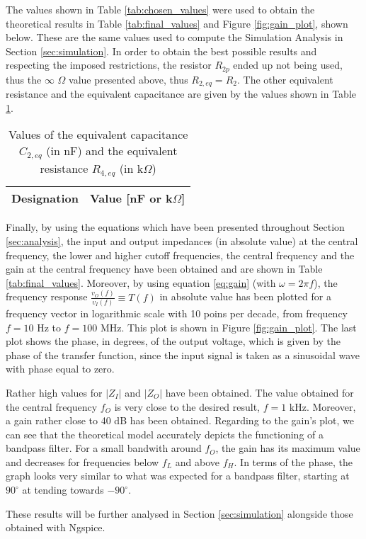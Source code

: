 The values shown in Table \ref{tab:chosen_values} were used to obtain the theoretical results in Table \ref{tab:final_values} and Figure \ref{fig:gain_plot}, shown below. These are the same values used to compute the Simulation Analysis in Section \ref{sec:simulation}. In order to obtain the best possible results and respecting the imposed restrictions, the resistor $R_{2p}$ ended up not being used, thus the $\infty$ $\Omega$ value presented above, thus $R_{2,eq}=R_2$. The other equivalent resistance and the equivalent capacitance are given by the values shown in Table \ref{tab:chosen_equiv_values}.

\begin{table}[H]
  \centering
  \begin{tabular}{|c|c|}
    \hline    
    {\bf Designation} & {\bf Value [nF or k$\Omega$]} \\ \hline
    
  \end{tabular}
  \caption{Values of the equivalent capacitance $C_{2,eq}$ (in nF) and the equivalent resistance $R_{4,eq}$ (in k$\Omega$)}
  \label{tab:chosen_equiv_values}
\end{table}

Finally, by using the equations which have been presented throughout Section \ref{sec:analysis}, the input and output impedances (in absolute value) at the central frequency, the lower and higher cutoff frequencies, the central frequency and the gain at the central frequency have been obtained and are shown in Table \ref{tab:final_values}. Moreover, by using equation \ref{eq:gain} (with $\omega=2\pi f$), the frequency response $\frac{v_O(f)}{v_I(f)}\equiv T(f)$ in absolute value has been plotted for a frequency vector in logarithmic scale with 10 poins per decade, from frequency $f=10$ Hz to $f=100$ MHz. This plot is shown in Figure \ref{fig:gain_plot}. The last plot shows the phase, in degrees, of the output voltage, which is given by the phase of the transfer function, since the input signal is taken as a sinusoidal wave with phase equal to zero.
\par
Rather high values for $|Z_I|$ and $|Z_O|$ have been obtained. The value obtained for the central frequency $f_O$ is very close to the desired result, $f=1$ kHz. Moreover, a gain rather close to 40 dB has been obtained. Regarding to the gain's plot, we can see that the theoretical model accurately depicts the functioning of a bandpass filter. For a small bandwith around $f_O$, the gain has its maximum value and decreases for frequencies below $f_L$ and above $f_H$. In terms of the phase, the graph looks very similar to what was expected for a bandpass filter, starting at $90^{\circ}$ at tending towards $-90^{\circ}$.
\par
These results will be further analysed in Section \ref{sec:simulation} alongside those obtained with Ngspice.

